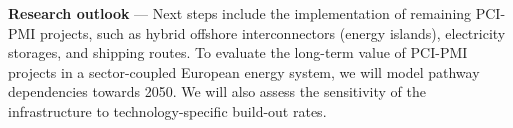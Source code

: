 \documentclass[10pt]{article}
\begin{document}
\textbf{Research outlook} --- Next steps include the implementation of remaining PCI-PMI projects, such as hybrid offshore interconnectors (energy islands), electricity storages, and  shipping routes. To evaluate the long-term value of PCI-PMI projects in a sector-coupled European energy system, we will model pathway dependencies towards 2050. We will also assess the sensitivity of the infrastructure to technology-specific build-out rates.




\end{document}
